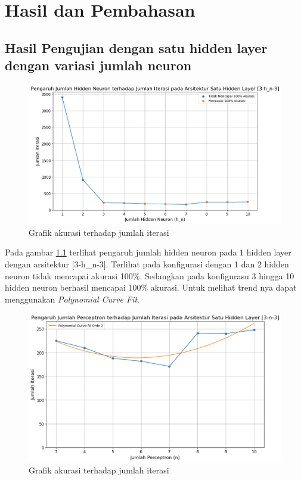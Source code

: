 \chapter{Hasil dan Pembahasan}
\section{Hasil Pengujian dengan satu hidden layer dengan variasi jumlah neuron}
\begin{figure}[H]
    \centering
    \includegraphics[width=14cm]{contents/chapter-4/1.png}
    \caption{Grafik akurasi terhadap jumlah iterasi}
    \label{fig:Plot VHN Iterasi}
\end{figure}

Pada gambar \ref{fig:Plot VHN Iterasi} terlihat pengaruh jumlah hidden neuron pada 1 hidden layer dengan arsitektur [3-h\_n-3]. Terlihat pada konfigurasi dengan 1 dan 2 hidden neuron tidak mencapai akurasi 100\%. Sedangkan pada konfigurasu 3 hingga 10 hidden neuron berhasil mencapai 100\% akurasi. Untuk melihat trend nya dapat menggunakan \textit{Polynomial Curve Fit}.

\begin{figure}[H]
    \centering
    \includegraphics[width=14cm]{contents/chapter-4/2.png}
    \caption{Grafik akurasi terhadap jumlah iterasi}
    \label{fig:Plot VHN Iterasi 2}
\end{figure}

